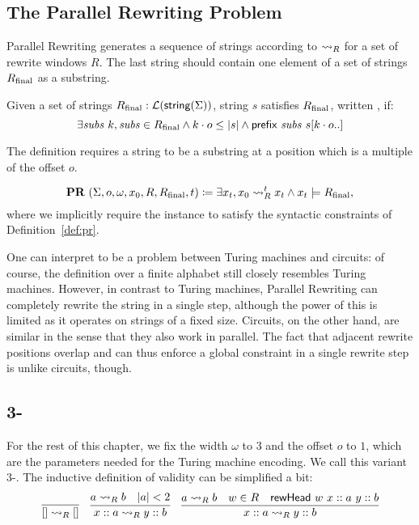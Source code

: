\subsection{The Parallel Rewriting Problem}
Parallel Rewriting generates a sequence of strings according to $\rightsquigarrow_{R}$ for a set of rewrite windows $R$. The last string should contain one element of a set of strings $R_{\text{final}}$ as a substring.
\begin{definition}
  Given a set of strings $R_{\text{final}} : \mathcal{L} (\textsf{string}{(\Sigma)})$, string $s$ satisfies $R_{\text{final}}$, written , if:
  \[\exists \mathit{subs}~k, \mathit{subs} \in R_{\text{final}} \land k \cdot o \le |s| \land \textsf{prefix}~\mathit{subs}~s[k \cdot o..] \]
\end{definition}
The definition requires a string to be a substring at a position which is a multiple of the offset $o$.

\begin{definition}
  \mnote{\PR{}}
  \[\textbf{PR}{}~(\Sigma, o, \omega, x_0, R, R_{\text{final}}, t) \coloneqq \exists x_t, x_0 \rightsquigarrow_{R}^t x_t \land x_t \models R_{\text{final}}, \]
  where we implicitly require the instance to satisfy the syntactic constraints of Definition~\ref{def:pr}. 
\end{definition}

One can interpret \PR{} to be a problem between Turing machines and circuits: of course, the definition over a finite alphabet still closely resembles Turing machines. However, in contrast to Turing machines, Parallel Rewriting can completely rewrite the string in a single step, although the power of this is limited as it operates on strings of a fixed size. 
Circuits, on the other hand, are similar in the sense that they also work in parallel. The fact that adjacent rewrite positions overlap and can thus enforce a global constraint in a single rewrite step is unlike circuits, though. 

\subsection{3-\PR{}}\label{sec:3pr}
For the rest of this chapter, we fix the width $\omega$ to $3$ and the offset $o$ to $1$, which are the parameters needed for the Turing machine encoding. We call this variant 3-\PR{}. 
The inductive definition of validity can be simplified a bit:
\begin{align*}
  \infer{\nil \strent{R} \nil}{} \quad
  \infer{x::a \strent{R} y ::b}{a \strent{R} b \quad \length{a} < 2} \quad
  \infer{x::a \strent{R} y :: b}{a \strent{R} b \quad w \in R \quad \rewHead{w}{x::a}{y::b}}
\end{align*}

